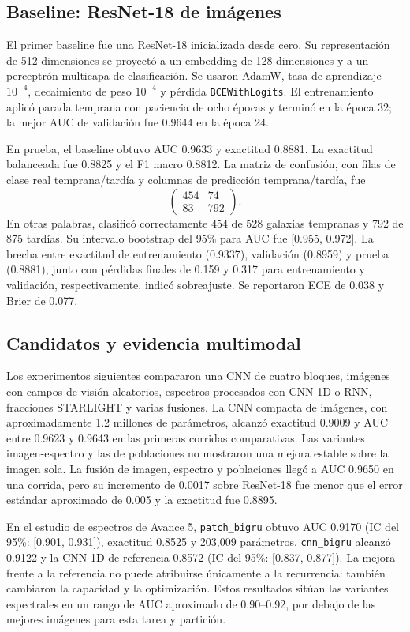 \documentclass[letterpaper,11pt]{article}
\begin{document}
\subsection{Baseline: ResNet-18 de imágenes}

El primer baseline fue una ResNet-18 inicializada desde cero. Su representación de 512 dimensiones se proyectó a un embedding de 128 dimensiones y a un perceptrón multicapa de clasificación. Se usaron AdamW, tasa de aprendizaje $10^{-4}$, decaimiento de peso $10^{-4}$ y pérdida \texttt{BCEWithLogits}. El entrenamiento aplicó parada temprana con paciencia de ocho épocas y terminó en la época 32; la mejor AUC de validación fue 0.9644 en la época 24.

En prueba, el baseline obtuvo AUC 0.9633 y exactitud 0.8881. La exactitud balanceada fue 0.8825 y el F1 macro 0.8812. La matriz de confusión, con filas de clase real temprana/tardía y columnas de predicción temprana/tardía, fue
\[
\begin{pmatrix}
454 & 74\\
83 & 792
\end{pmatrix}.
\]
En otras palabras, clasificó correctamente 454 de 528 galaxias tempranas y 792 de 875 tardías. Su intervalo bootstrap del 95\% para AUC fue [0.955, 0.972]. La brecha entre exactitud de entrenamiento (0.9337), validación (0.8959) y prueba (0.8881), junto con pérdidas finales de 0.159 y 0.317 para entrenamiento y validación, respectivamente, indicó sobreajuste. Se reportaron ECE de 0.038 y Brier de 0.077.

\subsection{Candidatos y evidencia multimodal}

Los experimentos siguientes compararon una CNN de cuatro bloques, imágenes con campos de visión aleatorios, espectros procesados con CNN 1D o RNN, fracciones STARLIGHT y varias fusiones. La CNN compacta de imágenes, con aproximadamente 1.2 millones de parámetros, alcanzó exactitud 0.9009 y AUC entre 0.9623 y 0.9643 en las primeras corridas comparativas. Las variantes imagen-espectro y las de poblaciones no mostraron una mejora estable sobre la imagen sola. La fusión de imagen, espectro y poblaciones llegó a AUC 0.9650 en una corrida, pero su incremento de 0.0017 sobre ResNet-18 fue menor que el error estándar aproximado de 0.005 y la exactitud fue 0.8895.

En el estudio de espectros de Avance 5, \texttt{patch\_bigru} obtuvo AUC 0.9170 (IC del 95\%: [0.901, 0.931]), exactitud 0.8525 y 203,009 parámetros. \texttt{cnn\_bigru} alcanzó 0.9122 y la CNN 1D de referencia 0.8572 (IC del 95\%: [0.837, 0.877]). La mejora frente a la referencia no puede atribuirse únicamente a la recurrencia: también cambiaron la capacidad y la optimización. Estos resultados sitúan las variantes espectrales en un rango de AUC aproximado de 0.90--0.92, por debajo de las mejores imágenes para esta tarea y partición.
\end{document}

